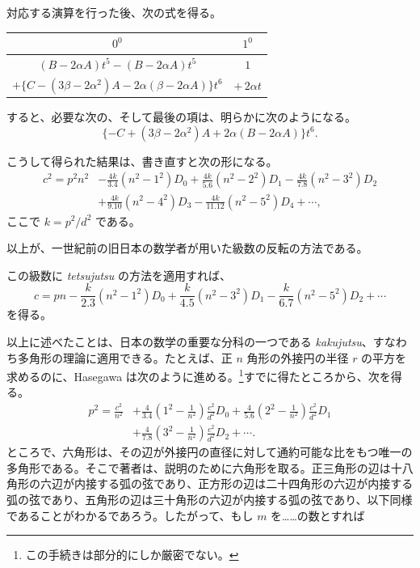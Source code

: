 \documentclass[11pt]{article}
\newcommand{\scanpage}[2]{\clearpage\setcounter{footnote}{0}\noindent{\footnotesize\color{gray}PDF #1 頁 · #2}\par\medskip}
\begin{document}
\noindent 対応する演算を行った後、次の式を得る。

\scanpage{0297}{印刷頁 283}
\begin{center}
\begin{tabular}{|c|c|}
\hline
$0^0$ & $1^0$\\
\hline
$(B-2\alpha A)t^5-(B-2\alpha A)t^5$ & $1$\\
$+\{C-(3\beta-2\alpha^2)A-2\alpha(\beta-2\alpha A)\}t^6$ & $+\,2\alpha t$\\
\hline
\end{tabular}
\end{center}

すると、必要な次の、そして最後の項は、明らかに次のようになる。
\[
\{-C+(3\beta-2\alpha^2)A+2\alpha(B-2\alpha A)\}t^6.
\]

こうして得られた結果は、書き直すと次の形になる。
\[
\begin{aligned}
c^2=p^2n^2&-\frac{4k}{3.4}(n^2-1^2)D_0+\frac{4k}{5.6}(n^2-2^2)D_1-\frac{4k}{7.8}(n^2-3^2)D_2\\
&+\frac{4k}{9.10}(n^2-4^2)D_3-\frac{4k}{11.12}(n^2-5^2)D_4+\cdots,
\end{aligned}
\]
ここで $k=p^2/d^2$ である。

以上が、一世紀前の旧日本の数学者が用いた級数の反転の方法である。

この級数に \emph{tetsujutsu} の方法を適用すれば、
\[
c=pn-\frac{k}{2.3}(n^2-1^2)D_0+\frac{k}{4.5}(n^2-3^2)D_1-\frac{k}{6.7}(n^2-5^2)D_2+\cdots
\]
を得る。

以上に述べたことは、日本の数学の重要な分科の一つである \emph{kakujutsu}、すなわち多角形の理論に適用できる。たとえば、正 $n$ 角形の外接円の半径 $r$ の平方を求めるのに、Hasegawa は次のように進める。\footnote{この手続きは部分的にしか厳密でない。}すでに得たところから、次を得る。
\[
\begin{aligned}
p^2=\frac{c^2}{n^2}&+\frac{4}{3.4}\left(1^2-\frac{1}{n^2}\right)\frac{c^2}{d^2}D_0+\frac{4}{5.6}\left(2^2-\frac{1}{n^2}\right)\frac{c^2}{d^2}D_1\\
&+\frac{4}{7.8}\left(3^2-\frac{1}{n^2}\right)\frac{c^2}{d^2}D_2+\cdots.
\end{aligned}
\]
ところで、六角形は、その辺が外接円の直径に対して通約可能な比をもつ唯一の多角形である。そこで著者は、説明のために六角形を取る。正三角形の辺は十八角形の六辺が内接する弧の弦であり、正方形の辺は二十四角形の六辺が内接する弧の弦であり、五角形の辺は三十角形の六辺が内接する弧の弦であり、以下同様であることがわかるであろう。したがって、もし $m$ を……の数とすれば
\end{document}
